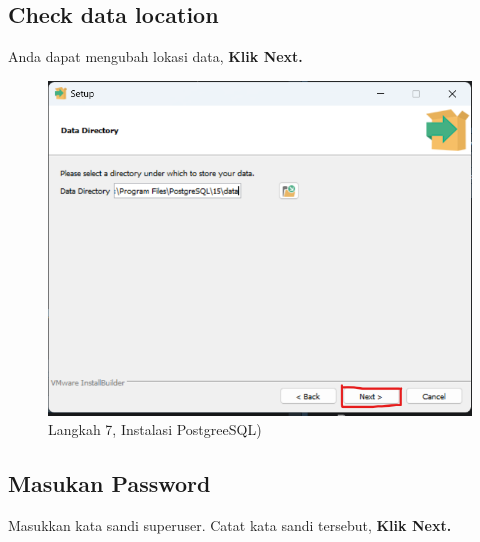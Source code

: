 \documentclass[
]{book}
\begin{document}
\hypertarget{check-data-location}{%
\subsection{Check data location}\label{check-data-location}}

Anda dapat mengubah lokasi data, \textbf{Klik Next.}

\begin{figure}

{\centering \includegraphics[width=1\linewidth]{./images/Bab1/Postgree6} 

}

\caption{Langkah 7, Instalasi PostgreeSQL)}\label{fig:install-posrgree7}
\end{figure}

\hypertarget{masukan-password}{%
\subsection{Masukan Password}\label{masukan-password}}

Masukkan kata sandi superuser. Catat kata sandi tersebut, \textbf{Klik Next.}
\end{document}
